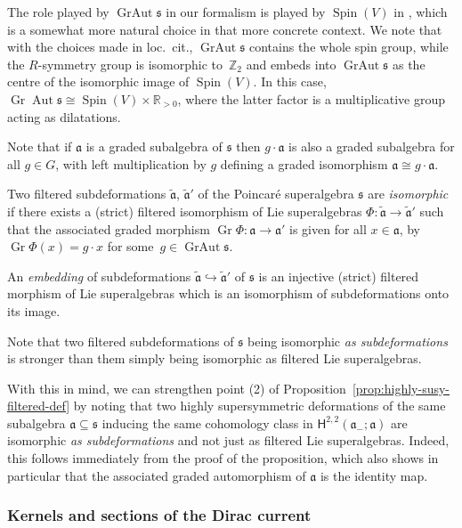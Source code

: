 \documentclass[pdftex]{sigma}
\numberwithin{equation}{section}
\newcommand{\fa}{\mathfrak{a}}
\newcommand{\fs}{\mathfrak{s}}
\newcommand{\RR}{\mathbb{R}}
\newcommand{\ZZ}{\mathbb{Z}}
\newcommand{\ssH}{\mathsf{H}}
\newcommand{\fatilde}{\widetilde{\fa}}
\newcommand{\1}{\mathbbm{1}}
\DeclareMathOperator{\Spin}{Spin}
\DeclareMathOperator{\Gr}{Gr}
\DeclareMathOperator{\Aut}{Aut}
\DeclareMathOperator{\GrAut}{GrAut}
\begin{document}
The role played by $\GrAut\fs$ in our formalism is played by $\Spin(V)$ in \cite{Figueroa-OFarrill2017_1}, which is a somewhat more natural choice in that more concrete context. We note that with the choices made in loc.\ cit., $\GrAut\fs$ contains the whole spin group, while the $R$-symmetry group is isomorphic to~$\ZZ_2$ and embeds into $\GrAut\fs$ as the centre of the isomorphic image of $\Spin(V)$. In this case, $\Gr\Aut\fs\cong\Spin(V)\times\RR_{>0}$, where the latter factor is a multiplicative group acting as dilatations.

Note that if $\fa$ is a graded subalgebra of $\fs$ then $g\cdot\fa$ is also a graded subalgebra for all $g\in G$, with left multiplication by $g$ defining a graded isomorphism $\fa\cong g\cdot\fa$.

\begin{Definition}\label{def:subdef-isom-embedding}
	Two filtered subdeformations $\fatilde$, $\fatilde'$ of the Poincar\'e superalgebra $\fs$ are \emph{isomorphic} if there exists a (strict) filtered isomorphism of Lie superalgebras $\Phi\colon \fatilde\to\fatilde'$ such that the associated graded morphism $\Gr\Phi\colon \fa\to\fa'$ is given for all $x\in \fa$, by $\Gr\Phi(x)=g\cdot x$ for some~${g\in\GrAut\fs}$.
	
	An \emph{embedding} of subdeformations $\fatilde\hookrightarrow\fatilde'$ of $\fs$ is an injective (strict) filtered morphism of Lie superalgebras which is an isomorphism of subdeformations onto its image.
\end{Definition}

Note that two filtered subdeformations of $\fs$ being isomorphic \emph{as subdeformations} is stronger than them simply being isomorphic as filtered Lie superalgebras.

With this in mind, we can strengthen point (2) of Proposition~\ref{prop:highly-susy-filtered-def} by noting that two highly supersymmetric deformations of the same subalgebra $\fa\subseteq\fs$ inducing the same cohomology class in $\ssH^{2,2}(\fa_-;\fa)$ are isomorphic \emph{as subdeformations} and not just as filtered Lie superalgebras. Indeed, this follows immediately from the proof of the proposition, which also shows in particular that the associated graded automorphism of $\fa$ is the identity map.

\subsubsection{Kernels and sections of the Dirac current}
\end{document}
